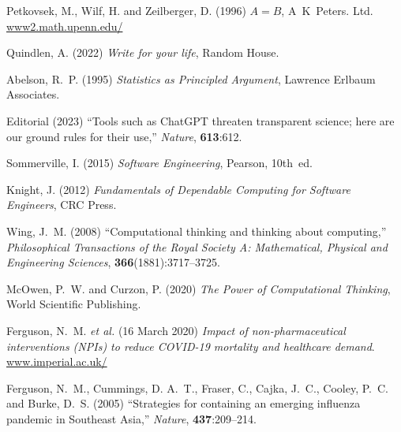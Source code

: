 \documentclass{comjnl}
\begin{document}
{\def\@cite#1#2{[{#1\if@tempswa , #2\fi}]}
\def\@biblabel#1{[#1]}
\makeatother

\begin{thebibliography}{100}

Petkovsek, M., Wilf, H. and Zeilberger, D. (1996) {\em {$A=B$}}, A~K~Peters.
  Ltd.
\newblock \url{www2.math.upenn.edu/}

Quindlen, A. (2022) {\em Write for your life}, Random House.

Abelson, R.~P. (1995) {\em Statistics as Principled Argument}, Lawrence Erlbaum
  Associates.

Editorial (2023) ``Tools such as {ChatGPT} threaten transparent science; here
  are our ground rules for their use,'' {\em Nature}, \textbf{613}:612.
\newblock {}

Sommerville, I. (2015) {\em Software Engineering}, Pearson, 10th~ed.

Knight, J. (2012) {\em Fundamentals of Dependable Computing for Software
  Engineers}, CRC Press.

Wing, J.~M. (2008) ``Computational thinking and thinking about computing,''
  {\em Philosophical Transactions of the {Royal Society A}: {M}athematical,
  Physical and Engineering Sciences}, \textbf{366}(1881):3717--3725.
\newblock {}

McOwen, P.~W. and Curzon, P. (2020) {\em The Power of Computational Thinking},
  World Scientific Publishing.

Ferguson, N.~M. \emph{et al.} (16 March 2020) {\em Impact of non-pharmaceutical
  interventions ({NPI}s) to reduce {COVID}-19 mortality and healthcare demand}.
\newblock
  \url{www.imperial.ac.uk/}

Ferguson, N.~M., Cummings, D. A.~T., Fraser, C., Cajka, J.~C., Cooley, P.~C.
  and Burke, D.~S. (2005) ``Strategies for containing an emerging influenza
  pandemic in {Southeast Asia},'' {\em Nature}, \textbf{437}:209--214.
\newblock {}


\end{thebibliography}}
\end{document}
